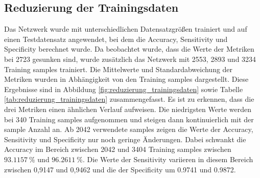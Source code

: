 \subsection{Reduzierung der Trainingsdaten}
Das Netzwerk wurde mit unterschiedlichen Datensatzgrößen trainiert und auf einen Testdatensatz angewendet, bei dem die Accuracy, Sensitivity und Specificity berechnet wurde.
Da beobachtet wurde, dass die Werte der Metriken bei 2723 gesunken sind, wurde zusätzlich das Netzwerk mit 2553, 2893 und 3234 
Training samples trainiert.
Die Mittelwerte und Standardabweichung der Metriken wurden in Abhängigkeit von den Training samples dargestellt.
Diese Ergebnisse sind in Abbildung \ref{fig:reduzierung_trainingsdaten} sowie Tabelle \ref{tab:reduzierung_trainingsdaten} zusammengefasst.
Es ist zu erkennen, dass die drei Metriken einen ähnlichen Verlauf aufweisen.
Die niedrigsten Werte werden bei 340 Training samples aufgenommen und steigen dann kontinuierlich mit der sample Anzahl an.
Ab 2042 verwendete samples zeigen die Werte der Accuracy, Sensitivity und Specificity nur noch geringe Änderungen.
Dabei schwankt die Accuracy im Bereich zwischen 2042 und 3404 Training samples zwischen $\qty{93.1157}{\%}$ und $\qty{96.2611}{\%}$. 
Die Werte der Sensitivity variieren in diesem Bereich zwischen 0,9147 und 0,9462 und die der Specificity um \SI{0,9741}{} und \SI{0,9872}{}.
